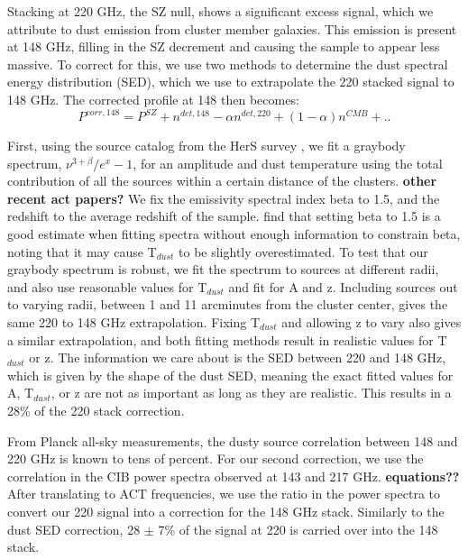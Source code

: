 \documentclass[twocolumn,iop]{emulateapj}
\begin{document}
Stacking at 220 GHz, the SZ null, shows a significant excess signal, which we attribute to dust emission from cluster member galaxies. This emission is present at 148 GHz, filling in the SZ decrement and causing the sample to appear less massive. To correct for this, we use two methods to determine the dust spectral energy distribution (SED), which we use to extrapolate the 220 stacked signal to 148 GHz. 
The corrected profile at 148 then becomes: 
\begin{equation}
P^{corr,148} = P^{SZ} + n^{det,148} - \alpha n^{det,220} + (1 - \alpha) n^{CMB} +..
\end{equation}

First, using the source catalog from the HerS survey \citep{2014ApJS..210...22V}, we fit a graybody spectrum, $\nu^{3+\beta}/{e^{x} - 1}$, for an amplitude and dust temperature using the total contribution of all the sources within a certain distance of the clusters. \textbf{other recent act papers?} We fix the emissivity spectral index beta to 1.5, and the redshift to the average redshift of the sample. \cite{2014A&A...561A..86M} find that setting beta to 1.5 is a good estimate when fitting spectra without enough information to constrain beta, noting that it may cause T$_{dust}$ to be slightly overestimated. To test that our graybody spectrum is robust, we fit the spectrum to sources at different radii, and also use reasonable values for T$_{dust}$ and fit for A  and z. Including sources out to varying radii, between 1 and 11 arcminutes from the cluster center, gives the same 220 to 148 GHz extrapolation. Fixing T$_{dust}$ and allowing z to vary also gives a similar extrapolation, and both fitting methods result in realistic values for T$_{dust}$ or z. The information we care about is the SED between 220 and 148 GHz, which is given by the shape of the dust SED, meaning the exact fitted values for A, T$_{dust}$, or z are not as important as long as they are realistic. This results in a 28\% of the 220 stack correction. 

From Planck all-sky measurements, the dusty source correlation between 148 and 220 GHz is known to tens of percent. For our second correction, we use the correlation in the CIB power spectra observed at 143 and 217 GHz. \citep{2014A&A...571A..16P} \textbf{equations??} After translating to ACT frequencies, we use the ratio in the power spectra to convert our 220 signal into a correction for the 148 GHz stack. Similarly to the dust SED correction, 28 $\pm$ 7\% of the signal at 220 is carried over into the 148 stack.
\end{document}
